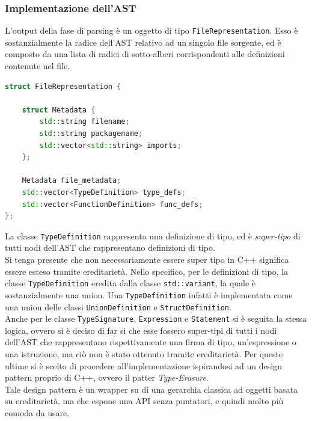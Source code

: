 \subsubsection{Implementazione dell'AST}
L'output della fase di parsing è un oggetto di tipo \texttt{FileRepresentation}. Esso 
è sostanzialmente la radice dell'AST relativo ad un singolo file sorgente, ed è 
composto da una lista di radici di sotto-alberi corrispondenti alle definizioni contenute 
nel file. \\

\vspace{0.5cm}
\begin{lstlisting}[language=C++, frame=single]
struct FileRepresentation {

    struct Metadata {
        std::string filename;
        std::string packagename;
        std::vector<std::string> imports;
    };

    Metadata file_metadata;
    std::vector<TypeDefinition> type_defs;
    std::vector<FunctionDefinition> func_defs;
};
\end{lstlisting}
\vspace{0.5cm}

La classe \texttt{TypeDefinition} rappresenta una definizione di tipo, ed è \textit{super-tipo}
di tutti nodi dell'AST che rappresentano definizioni di tipo. \\

Si tenga presente che non necessariamente essere super tipo in C++ significa essere esteso 
tramite ereditarietà. Nello specifico, per le definizioni di tipo, la classe 
\texttt{TypeDefinition} eredita dalla classe \texttt{std::variant}, la quale è 
sostanzialmente una union. Una \texttt{TypeDefinition} infatti è implementata 
come una union delle classi \texttt{UnionDefinition} e 
\texttt{StructDefinition}. \\ 

Anche per le classe \texttt{TypeSignature}, \texttt{Expression} e \texttt{Statement}
si è seguita la stessa logica, ovvero si è deciso di far si che esse fossero super-tipi 
di tutti i nodi dell'AST che rappresentano rispettivamente una firma di tipo, un'espressione
o una istruzione, ma ciò non è stato ottenuto tramite ereditarietà. Per queste ultime si è 
scelto di procedere all'implementazione ispirandosi ad un design pattern proprio di 
C++, ovvero il patter \textit{Type-Erasure}. \\

Tale design pattern è un wrapper su di una gerarchia classica ad oggetti basata su ereditarietà,
ma che espone una API senza puntatori, e quindi molto più comoda da usare. \\

